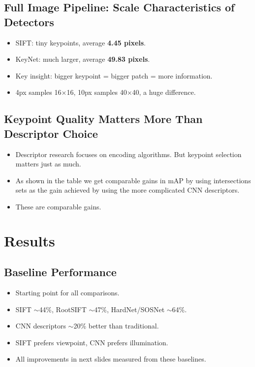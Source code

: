 \documentclass[11pt, letterpaper]{article}
\begin{document}
\subsection{Full Image Pipeline: Scale Characteristics of Detectors}
\begin{itemize}
  \item SIFT: tiny keypoints, average \textbf{4.45 pixels}.
  \item KeyNet: much larger, average \textbf{49.83 pixels}.
  \item Key insight: bigger keypoint = bigger patch = more information.
  \item 4px samples 16$\times$16, 10px samples 40$\times$40, a huge difference.
\end{itemize}

\subsection{Keypoint Quality Matters More Than Descriptor Choice}
\begin{itemize}
  \item Descriptor research focuses on encoding algorithms. But keypoint selection matters just as much.
  \item As shown in the table we get comparable gains in mAP by using intersections sets as the gain achieved by using the more complicated CNN descriptors.
  \item These are comparable gains.
\end{itemize}

\newpage
\section{Results}

\subsection{Baseline Performance}
\begin{itemize}
  \item Starting point for all comparisons.
  \item SIFT $\sim$44\%, RootSIFT $\sim$47\%, HardNet/SOSNet $\sim$64\%.
  \item CNN descriptors $\sim$20\% better than traditional.
  \item SIFT prefers viewpoint, CNN prefers illumination.
  \item All improvements in next slides measured from these baselines.
\end{itemize}
\end{document}

